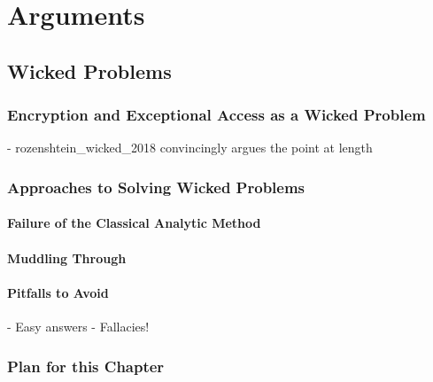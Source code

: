 \chapter{Arguments}
\label{chap-arguments}

\section{Wicked Problems}

\subsection{Encryption and Exceptional Access as a Wicked Problem}

- rozenshtein_wicked_2018 convincingly argues the point at length

\subsection{Approaches to Solving Wicked Problems}

\subsubsection{Failure of the Classical Analytic Method}

\subsubsection{Muddling Through}


\subsubsection{Pitfalls to Avoid}

- Easy answers
- Fallacies!

\subsection{Plan for this Chapter}


